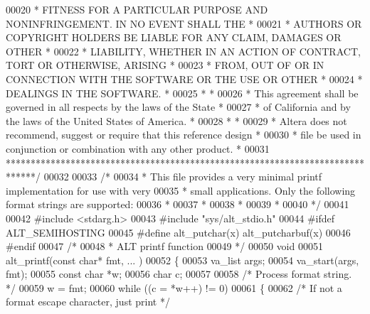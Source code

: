 \begin{DoxyCode}
00020 \textcolor{comment}{* FITNESS FOR A PARTICULAR PURPOSE AND NONINFRINGEMENT. IN NO EVENT SHALL THE *}
00021 \textcolor{comment}{* AUTHORS OR COPYRIGHT HOLDERS BE LIABLE FOR ANY CLAIM, DAMAGES OR OTHER      *}
00022 \textcolor{comment}{* LIABILITY, WHETHER IN AN ACTION OF CONTRACT, TORT OR OTHERWISE, ARISING     *}
00023 \textcolor{comment}{* FROM, OUT OF OR IN CONNECTION WITH THE SOFTWARE OR THE USE OR OTHER         *}
00024 \textcolor{comment}{* DEALINGS IN THE SOFTWARE.                                                   *}
00025 \textcolor{comment}{*                                                                             *}
00026 \textcolor{comment}{* This agreement shall be governed in all respects by the laws of the State   *}
00027 \textcolor{comment}{* of California and by the laws of the United States of America.              *}
00028 \textcolor{comment}{*                                                                             *}
00029 \textcolor{comment}{* Altera does not recommend, suggest or require that this reference design    *}
00030 \textcolor{comment}{* file be used in conjunction or combination with any other product.          *}
00031 \textcolor{comment}{******************************************************************************/}
00032 
00033 \textcolor{comment}{/*}
00034 \textcolor{comment}{ * This file provides a very minimal printf implementation for use with very}
00035 \textcolor{comment}{ * small applications.  Only the following format strings are supported:}
00036 \textcolor{comment}{ *   %
00037 \textcolor{comment}{ *   %
00038 \textcolor{comment}{ *   %
00039 \textcolor{comment}{ *   %
00040 \textcolor{comment}{ */}
00041 
00042 \textcolor{preprocessor}{#include <stdarg.h>}
00043 \textcolor{preprocessor}{#include "sys/alt_stdio.h"}
00044 \textcolor{preprocessor}{#ifdef ALT\_SEMIHOSTING}
00045 \textcolor{preprocessor}{#define alt\_putchar(x) alt\_putcharbuf(x)}
00046 \textcolor{preprocessor}{#endif}
00047 \textcolor{comment}{/* }
00048 \textcolor{comment}{ * ALT printf function }
00049 \textcolor{comment}{ */}
00050 \textcolor{keywordtype}{void} 
00051 alt_printf(\textcolor{keyword}{const} \textcolor{keywordtype}{char}* fmt, ... )
00052 \{
00053     va\_list args;
00054     va\_start(args, fmt);
00055     \textcolor{keyword}{const} \textcolor{keywordtype}{char} *w;
00056     \textcolor{keywordtype}{char} c;
00057 
00058     \textcolor{comment}{/* Process format string. */}
00059     w = fmt;
00060     \textcolor{keywordflow}{while} ((c = *w++) != 0)
00061     \{
00062         \textcolor{comment}{/* If not a format escape character, just print  */}
}}}}
\end{DoxyCode}
